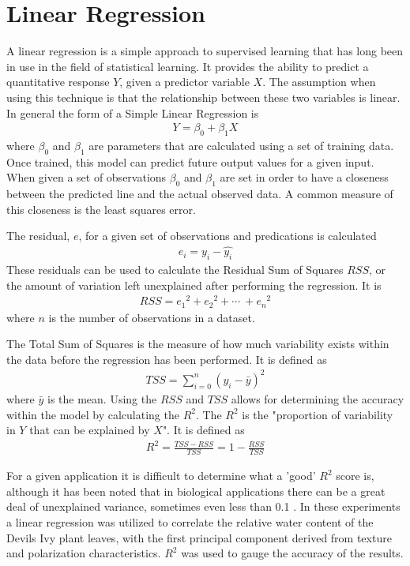 \section{Linear Regression}
A linear regression is a simple approach to supervised learning that has long been in use in the field of statistical learning.  It provides the ability to predict a quantitative response $Y$, given a predictor variable $X$.  The assumption when using this technique is that the relationship between these two variables is linear.  In general the form of a Simple Linear Regression is
%
\begin{align}
    Y = \beta_0 + \beta_1 X
\end{align}
%
where $\beta_0$ and $\beta_1$ are parameters that are calculated using a set of training data.  Once trained, this model can predict future output values for a given input.  When given a set of observations $\beta_0$ and $\beta_1$ are set in order to have a closeness between the predicted line and the actual observed data.  A common measure of this closeness is the least squares error.

The residual, $e$, for a given set of observations and predications is calculated
%
\begin{align}
    e_i = y_i - \hat{y_i}
\end{align}
%
These residuals can be used to calculate the Residual Sum of Squares \(RSS\), or the amount of variation left unexplained after performing the regression.  It is
\begin{align}
    RSS = {e_1}^2 + {e_2}^2 + \cdots\ + {e_n}^2
\end{align}
where $n$ is the number of observations in a dataset.

The Total Sum of Squares is the measure of how much variability exists within the data before the regression has been performed.  It is defined as
\begin{align}
    TSS = \sum_{i=0}^n (y_i - \bar{y})^2
\end{align}
where $\bar{y}$ is the mean.  Using the $RSS$ and $TSS$ allows for determining the accuracy within the model by calculating the $R^2$.  The $R^2$ is the "proportion of variability in $Y$ that can be explained by $X$". It is defined as
\begin{align}
    R^2 = \frac{TSS - RSS}{TSS} = 1 - \frac{RSS}{TSS}
\end{align}

For a given application it is difficult to determine what a 'good' $R^2$ score is, although it has been noted that in biological applications there can be a great deal of unexplained variance, sometimes even less than 0.1 \cite{stats}.  In these experiments a linear regression was utilized to correlate the relative water content of the Devils Ivy plant leaves, with the first principal component derived from texture and polarization characteristics.  $R^2$ was used to gauge the accuracy of the results.

